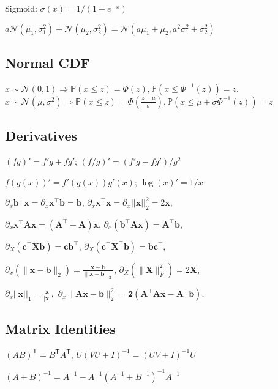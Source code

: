 \documentclass[11pt,landscape,a4paper,fleqn]{article}
\newcommand*{\tran}{^{\mathsf{T}}} %
\begin{document}
\begin{multicols*}{4}
Sigmoid: $\sigma(x)=1/(1+e^{-x})$

\mbox{$a \mathcal{N}(\mu_1, \sigma_1^2) + \mathcal{N}(\mu_2, \sigma_2^2) = \mathcal{N}(a\mu_1 + \mu_2, a^2 \sigma_1^2 + \sigma_2^2)$}

\subsection*{Normal CDF}

\(x \sim \mathcal{N}(0, 1) \Rightarrow
\mathbb{P}(x \leq z) = \Phi(z),
\mathbb{P}(x \leq \Phi^{-1}(z)) = z\).
\(x \sim \mathcal{N}(\mu, \sigma^2) \Rightarrow
\mathbb{P}(x \leq z) = \Phi(\frac{z - \mu}{\sigma}),
\mathbb{P}(x \leq \mu + \sigma \Phi^{-1}(z)) = z\)

\subsection*{Derivatives}
$(fg)' = f'g + fg'$; $(f/g)' = (f'g - fg')/g^2$

$f(g(x))' = f'(g(x))g'(x)$; $\log(x)' = 1/x$

$\partial_x \mathbf{b}^\top \mathbf{x} = \partial_x \mathbf{x}^\top \mathbf{b} = \mathbf{b}$,
$\partial_x \mathbf{x}^\top \mathbf{x} = \partial_x  ||\mathbf{x}||_2^2 = 2\mathbf{x}$,

$\partial_x \mathbf{x}^\top \mathbf{A}\mathbf{x} = (\mathbf{A}^\top + \mathbf{A})\mathbf{x}$, $\partial_x(\mathbf{b}^\top \mathbf{A}\mathbf{x}) = \mathbf{A}^\top \mathbf{b}$,

$\partial_X (\mathbf{c}^\top \mathbf{X} \mathbf{b}) = \mathbf{c}\mathbf{b}^\top$,
$\partial_X (\mathbf{c}^\top \mathbf{X}^\top \mathbf{b}) = \mathbf{b}\mathbf{c}^\top$,

$\partial_x (\| \mathbf{x}-\mathbf{b} \|_2) = \frac{\mathbf{x}-\mathbf{b}}{\|\mathbf{x}-\mathbf{b}\|_2}$,
$\partial_X (\|\mathbf{X}\|_F^2) = 2\mathbf{X}$,

\mbox{\fontsize{9.5}{6}\selectfont $\partial_x ||\mathbf{x}||_1 = \frac{\mathbf{x}}{|\mathbf{x}|}$,
$\partial_x \|\mathbf{Ax - b}\|_2^2 = \mathbf{2(A^\top Ax-A^\top b)}$},

\subsection*{Matrix Identities}

\((AB)\tran = B\tran A\tran\), \(U(VU + I)^{-1} = (UV + I)^{-1}U\)

\((A + B)^{-1} = A^{-1} - A^{-1} (A^{-1} + B^{-1})^{-1} A^{-1}\)


\end{multicols*}
\end{document}
